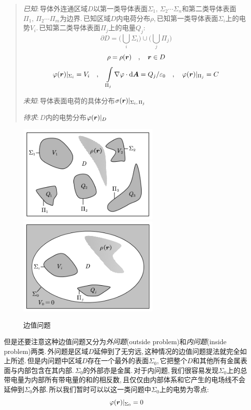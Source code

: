 \begin{verse}
\emph{已知}:\,导体外连通区域$D$以第一类导体表面$\Sigma_1,\,\Sigma_2\cdots\Sigma_n$和第二类导体表面$\Pi_1,\,\Pi_2\cdots\Pi_m$为边界.\,已知区域$D$内电荷分布$\rho$,\,已知第一类导体表面$\Sigma_i$上的电势$V_i$.\,已知第二类导体表面$\Pi_j$上的电量$Q_j$:
\[\partial D=\biggl(\bigcup_i \Sigma_i\biggr)\cup \biggl(\bigcup_j\Pi_j  \biggr) \]
\[\rho=\rho(\boldsymbol{r}) \quad,\quad \boldsymbol{r}\in D\]
\[\varphi(\boldsymbol{r})|_{\Sigma_i}=V_i \quad, \quad \int\limits_{\Pi_j}\nabla\varphi\cdot \textrm{d} \boldsymbol{A}=Q_j/\varepsilon_0 \quad, \quad \varphi(\boldsymbol{r})|_{\Pi_j}=C\]

\emph{未知}:\,导体表面电荷的具体分布$\sigma(\boldsymbol{r})|_{\Sigma_i,\,\Pi_j}$

\emph{待求}:\,$D$内的电势分布$\varphi(\boldsymbol{r})|_{D}$

\end{verse}


\begin{figure}
\vspace{-0.6cm}
\centering
\includegraphics[width=7cm]{image/7-2-4.png}
\includegraphics[width=7cm]{image/7-2-5.png}
\caption{边值问题}
\end{figure}
但是还要注意这种边值问题又分为\emph{外问题}(outside problem)和\emph{内问题}(inside problem)两类.\,外问题是区域$D$延伸到了无穷远,\,这种情况的边值问题提法就完全如上所述.\,但是内问题中区域$D$存在一个最外的表面$\Sigma_0$,\,它把整个$D$和其他所有金属表面与内部包含在其内部.\,$\Sigma_0$的外部亦是金属.\,对于内问题,\,我们很容易发现$\Sigma_0$上的总带电量为内部所有带电量的和的相反数,\,且仅仅由内部体系和它产生的电场线不会延伸到$\Sigma_0$外部.\,所以我们暂时可以以这一类问题中$\Sigma_0$上的电势为零点:
\[\varphi(\boldsymbol{r})|_{\Sigma_0}=0\]


